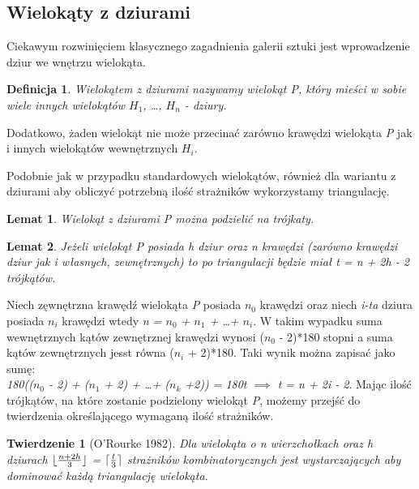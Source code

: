 \documentclass[brudnopis]{xmgr}
\DeclarePairedDelimiter\ceil{\lceil}{\rceil}
\DeclarePairedDelimiter\floor{\lfloor}{\rfloor}
\newtheorem{Twierdzenie}{Twierdzenie}
\newtheorem{Lemat}{Lemat}
\newtheorem{Definicja}{Definicja}
\begin{document}
\subsection{Wielokąty z dziurami}
Ciekawym rozwinięciem klasycznego zagadnienia galerii sztuki jest wprowadzenie dziur we wnętrzu wielokąta.

\begin{Definicja}\label{def wielokat z dziurami}
  Wielokątem z dziurami nazywamy wielokąt P, który mieści w sobie wiele innych wielokątów $H_1$, \ldots, $H_n$ - dziury.
\end{Definicja}
Dodatkowo, żaden wielokąt nie może przecinać zarówno krawędzi wielokąta \textit{P} jak i innych wielokątów wewnętrznych $H_i$.

\indent Podobnie jak w przypadku standardowych wielokątów, również dla wariantu z dziurami aby obliczyć potrzebną ilość strażników wykorzystamy triangulację.

\begin{Lemat}
  Wielokąt z dziurami P można podzielić na trójkaty.
\end{Lemat}

\begin{Lemat}\label{t trójkątów triangulacja}
  Jeżeli wielokąt P posiada h dziur oraz n krawędzi (zarówno krawędzi dziur jak i własnych, zewnętrznych) to po triangulacji będzie miał t = n + 2h - 2 trójkątów.
\end{Lemat}
\indent Niech zęwnętrzna krawędź wielokąta \textit{P} posiada $n_0$ krawędzi oraz niech \textit{i-ta} dziura posiada $n_i$ krawędzi wtedy \textit{n = $n_0$ + $n_1$ + \ldots + $n_i$}. W takim wypadku suma wewnętrznych kątów zewnętrznej krawędzi wynosi ($n_0$ - 2)*180 stopni a suma kątów zewnętrznych jesst równa ($n_i$ + 2)*180.
Taki wynik można zapisać jako sumę:
\\\textit{180(($n_0$ - 2) + ($n_1$ + 2) + \ldots + ($n_k$ +2)) = 180t $\implies$ t = n + 2i - 2}.
Mając ilość trójkątów, na które zostanie podzielony wielokąt \textit{P}, możemy przejść do twierdzenia określającego wymaganą ilość strażników.

\begin{Twierdzenie}[O'Rourke 1982]
  Dla wielokąta o n wierzchołkach oraz h dziurach $\floor{\frac{n+2h}{3}}$ = $\ceil{\frac{t}{3}}$ strażników kombinatorycznych jest wystarczających aby dominować każdą triangulację wielokąta.
\end{Twierdzenie}
\end{document}
